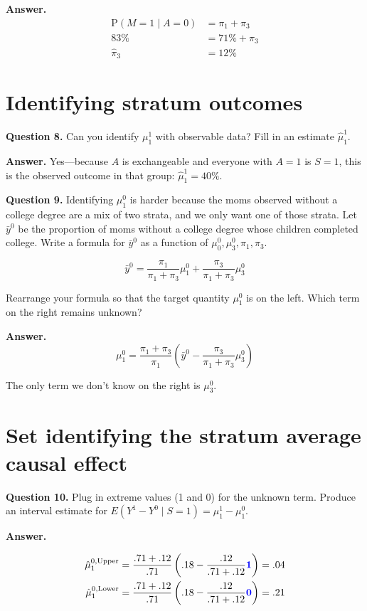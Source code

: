 \documentclass[10pt]{article}
\renewcommand{\P}{\text{P}}
\begin{document}
\textbf{Answer.}
$$\begin{aligned}
\P(M = 1 \mid A = 0) &= \pi_1 + \pi_3 \\
83\% &= 71\% + \hat\pi_3 \\
\hat\pi_3 &= 12\%
\end{aligned}$$

\section*{Identifying stratum outcomes}

\textbf{Question 8.} Can you identify $\mu^1_1$ with observable data? Fill in an estimate $\hat\mu^1_1$.

\textbf{Answer.} Yes---because $A$ is exchangeable and everyone with $A = 1$ is $S = 1$, this is the observed outcome in that group: $\hat\mu^1_1 = 40\%$.

\textbf{Question 9.} Identifying $\mu^0_1$ is harder because the moms observed without a college degree are a mix of two strata, and we only want one of those strata. Let $\bar{y}^0$ be the proportion of moms without a college degree whose children completed college. Write a formula for $\bar{y}^0$ as a function of $\mu^0_0,\mu^0_3,\pi_1,\pi_3$.

$$\bar{y}^0 = \frac{\pi_1}{\pi_1 + \pi_3}\mu^0_1 + \frac{\pi_3}{\pi_1 + \pi_3}\mu^0_3$$

Rearrange your formula so that the target quantity $\mu^0_1$ is on the left. Which term on the right remains unknown?

\textbf{Answer.}
$$\mu^0_1 = \frac{\pi_1 + \pi_3}{\pi_1}\left(\bar{y}^0 - \frac{\pi_3}{\pi_1 + \pi_3}\mu^0_3\right)$$

The only term we don't know on the right is $\mu^0_3$.

\section*{Set identifying the stratum average causal effect}

\textbf{Question 10.} Plug in extreme values (1 and 0) for the unknown term. Produce an interval estimate for $E(Y^1 - Y^0\mid S = 1) = \mu^1_1 - \mu^0_1$.

\textbf{Answer.}

$$\begin{aligned}
\hat\mu^{0,\text{Upper}}_1 &= \frac{.71 + .12}{.71}\left(.18 - \frac{.12}{.71 + .12}\textcolor{blue}{\mathbf{1}}\right) = .04  \\
\hat\mu^{0,\text{Lower}}_1 &= \frac{.71 + .12}{.71}\left(.18 - \frac{.12}{.71 + .12}\textcolor{blue}{\mathbf{0}}\right) = .21
\end{aligned}$$
\end{document}
